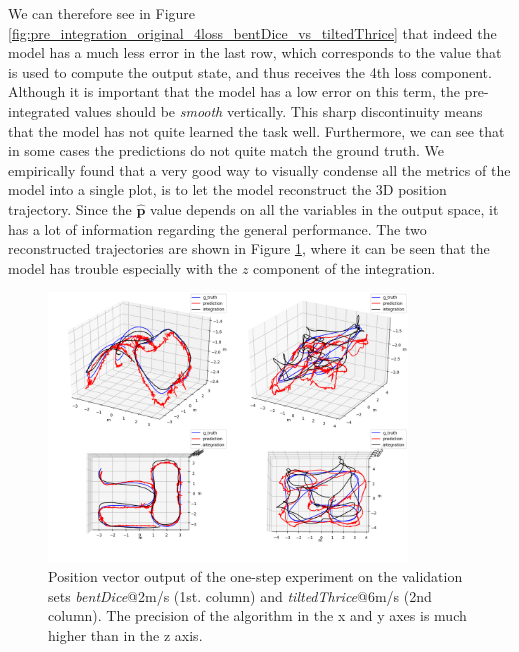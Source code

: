 We can therefore see in Figure \ref{fig:pre_integration_original_4loss_bentDice_vs_tiltedThrice} that indeed the model has a much less error in the last row, which corresponds to the value that is used to compute the output state, and thus receives the 4th loss component.
Although it is important that the model has a low error on this term, the pre-integrated values should be \emph{smooth} vertically.
This sharp discontinuity means that the model has not quite learned the task well. 
Furthermore, we can see that in some cases the predictions do not quite match the ground truth.
We empirically found that a very good way to visually condense all the metrics of the model into a single plot, is to let the model reconstruct the 3D position trajectory.
Since the $\mathbf{\hat{p}}$ value depends on all the variables in the output space, it has a lot of information regarding the general performance. 
The two reconstructed trajectories are shown in Figure \ref{fig:position_3D_original_4loss_bentDice_vs_tiltedThrice}, where it can be seen that the model has trouble especially with the $z$ component of the integration.

\begin{figure}[h]
   \centering
   \includegraphics[width=0.85\textwidth]{thesis_template/img/pre_integration_original_4_loss_bentDice_vs_tiltedThrice_3D.jpg}
   \caption{Position vector output of the one-step experiment on the validation sets \emph{bentDice}@2m/s (1st. column) and \emph{tiltedThrice}@6m/s (2nd column).
   The precision of the algorithm in the x and y axes is much higher than in the z axis.}
   \label{fig:position_3D_original_4loss_bentDice_vs_tiltedThrice}
\end{figure}

